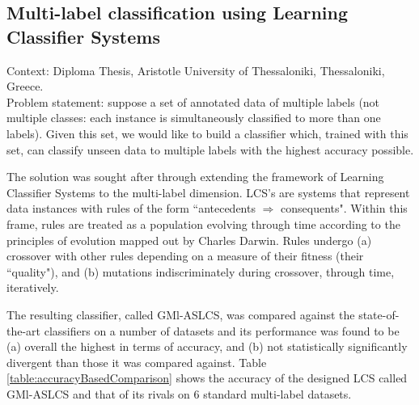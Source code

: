 \subsection{Multi-label classification using Learning Classifier Systems}

Context: Diploma Thesis, Aristotle University of Thessaloniki, Thessaloniki, Greece.\\

Problem statement: suppose a set of annotated data of multiple labels (not
multiple classes: each instance is simultaneously classified to more than one
labels). Given this set, we would like to build a classifier which, trained with
this set, can classify unseen data to multiple labels with the highest accuracy
possible.

The solution was sought after through extending the framework of Learning
Classifier Systems to the multi-label dimension. LCS's are systems that
represent data instances with rules of the form ``antecedents $\Rightarrow$
consequents". Within this frame, rules are treated as a population evolving
through time according to the principles of evolution mapped out by Charles
Darwin. Rules undergo (a) crossover with other rules depending on a measure of
their fitness (their ``quality"), and (b) mutations indiscriminately during
crossover, through time, iteratively.

The resulting classifier, called GMl-ASLCS, was compared against the
state-of-the-art classifiers on a number of datasets and its performance was
found to be (a) overall the highest in terms of accuracy, and (b) not
statistically significantly divergent than those it was compared against. Table
\ref{table:accuracyBasedComparison} shows the accuracy of the designed LCS
called GMl-ASLCS and that of its rivals on 6 standard multi-label datasets.

